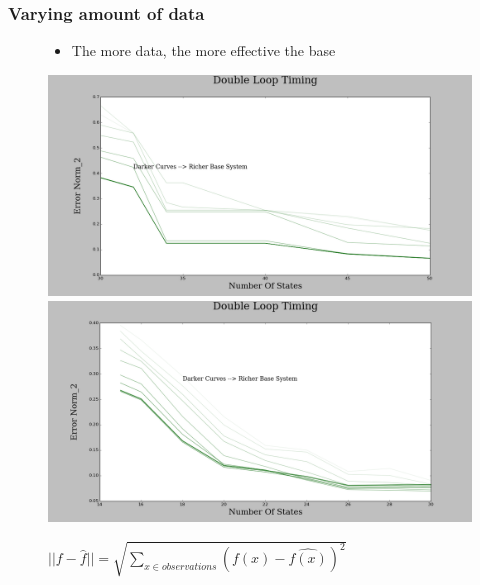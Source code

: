 \documentclass{beamer}
\begin{document}
\begin{frame}
\frametitle{Varying amount of data}


\begin{figure}

\begin{itemize}
\item The more data, the more effective the base

\end{itemize}
\includegraphics[width=0.5\linewidth]{lucasplots/monImages/DoubleLoopTiming0.png}
\includegraphics[width=0.5\linewidth]{lucasplots/monImages/DoubleLoopTiming0_1.png}

$||f - \hat{f}|| = \sqrt{\sum\nolimits_{x \in observations}(f(x) - \hat{f(x)})^2}$ 

\end{figure}
\end{frame}

\end{document}
